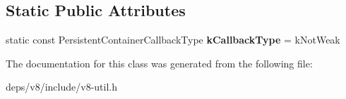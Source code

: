 \subsection*{Static Public Attributes}
\begin{DoxyCompactItemize}
\item 
\hypertarget{classv8_1_1_default_phantom_persistent_value_map_traits_a798ba69e99e308830a57cb47d4fd5bbb}{}static const Persistent\+Container\+Callback\+Type {\bfseries k\+Callback\+Type} = k\+Not\+Weak\label{classv8_1_1_default_phantom_persistent_value_map_traits_a798ba69e99e308830a57cb47d4fd5bbb}

\end{DoxyCompactItemize}


The documentation for this class was generated from the following file\+:\begin{DoxyCompactItemize}
\item 
deps/v8/include/v8-\/util.\+h\end{DoxyCompactItemize}
